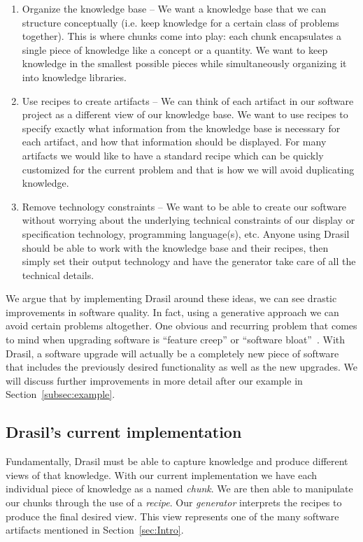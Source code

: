 \documentclass[preprint, 10pt]{sigplanconf}
\begin{document}
\begin{enumerate}
\item Organize the knowledge base -- We want a knowledge base that we can
structure conceptually (i.e. keep knowledge for a certain class of problems
together). This is where chunks come into play: each chunk encapsulates a single
piece of knowledge like a concept or a quantity. We want to keep knowledge in
the smallest possible pieces while simultaneously organizing it into knowledge
libraries.

\item Use recipes to create artifacts -- We can think of each artifact in our
software project as a different view of our knowledge base. We want to use
recipes to specify exactly what information from the knowledge base is necessary
for each artifact, and how that information should be displayed. For many
artifacts we would like to have a standard recipe which can be quickly
customized for the current problem and that is how we will avoid duplicating
knowledge.

\item Remove technology constraints -- We want to be able to create our software
without worrying about the underlying technical constraints of our display or
specification technology, programming language(s), etc. Anyone using Drasil
should be able to work with the knowledge base and their recipes, then simply
set their output technology and have the generator take care of all the
technical details.
\end{enumerate}

We argue that by implementing Drasil around these ideas, we can see drastic
improvements in software quality. In fact, using a generative approach we can
avoid certain problems altogether. One obvious and recurring problem that comes
to mind when upgrading software is ``feature creep'' or ``software
bloat''~\cite{AmselEtAl2011}. With Drasil, a software upgrade will actually be a
completely new piece of software that includes the previously desired
functionality as well as the new upgrades. We will discuss further improvements
in more detail after our example in Section~\ref{subsec:example}.

\subsection{Drasil's current implementation}
\label{subsec:current}

Fundamentally, Drasil must be able to capture knowledge and produce different
views of that knowledge. With our current implementation we have each individual
piece of knowledge as a named \emph{chunk}. We are then able to manipulate our
chunks through the use of a \emph{recipe}. Our \emph{generator} interprets the
recipes to produce the final desired view. This view represents one of the many
software artifacts mentioned in Section~\ref{sec:Intro}.
\end{document}
